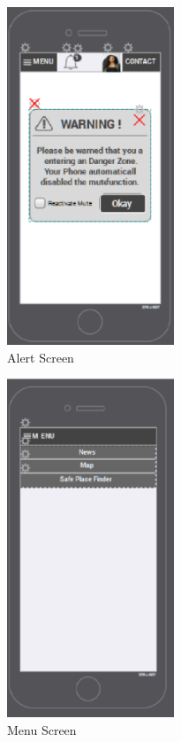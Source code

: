\begin{figure}[htbp]
\begin{center}
 \caption{\label{fig:A4} Alert Screen}
   \includegraphics[width=50mm]{./images/App/alerscreen.eps}
\end{center}
\end{figure}
\begin{figure}[htbp]
\begin{center}
 \caption{\label{fig:A3P} Menu Screen}
   \includegraphics[width=50mm]{./images/App/cmenu.eps}
\end{center}
\end{figure}
